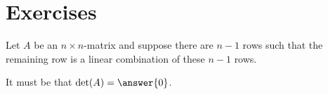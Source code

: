 \documentclass{ximera}
\author{Zack Reed}
\begin{document}
\section*{Exercises}




\begin{problem}
  Let $A$ be an $n\times n$-matrix and suppose there are $n-1$ rows
  such that the remaining row is a linear combination of these $n-1$
  rows. 
  
  It must be that $\det(A) = \answer{0}$.
\end{problem}
\end{document}
